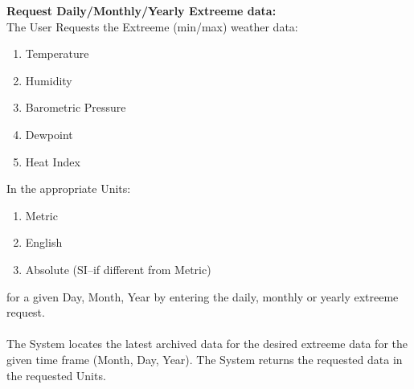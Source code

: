 \documentclass[letterpaper]{article}
\begin{document}
\noindent
\textbf{Request Daily/Monthly/Yearly Extreeme data:  }\\
The User Requests the Extreeme (min/max) weather data:
\begin{enumerate}
\item Temperature
\item Humidity
\item Barometric Pressure
\item Dewpoint
\item Heat Index
\end{enumerate}
In the appropriate Units:
\begin{enumerate}
\item Metric
\item English
\item Absolute (SI--if different from Metric)
\end{enumerate}
for a given Day, Month, Year by entering the daily, monthly or yearly
extreeme request.\\\\
The System locates the latest archived data for the desired
extreeme data for the given time frame (Month, Day, Year).  The
System returns the requested data in the requested Units.
\end{document}
